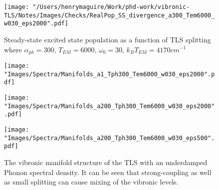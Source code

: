 \documentclass[]{article}
\begin{document}
\begin{figure}[h]
	\centering
	\texttt{[image: "/Users/henrymaguire/Work/phd-work/vibronic-TLS/Notes/Images/Checks/RealPop\_SS\_divergence\_a300\_Tem6000\_w030\_eps2000".pdf]}
	\caption{Steady-state excited state population as a function of TLS splitting where $\alpha_{ph}=300$, $T_{EM} =6000$, $\omega_0 = 30$, $k_B T_{EM}=4170cm^{-1}$}
	\label{fig:steadyStatevsSplitting}
\end{figure}

\begin{figure}[h]
	\centering
	\begin{minipage}[b]{0.325\textwidth}
		\texttt{[image: "Images/Spectra/Manifolds\_a1\_Tph300\_Tem6000\_w030\_eps2000".pdf]}
		\caption{}
		\label{fig:manifold_weakcoupling}
	\end{minipage}
	\begin{minipage}[b]{0.325\textwidth}
		\texttt{[image: "Images/Spectra/Manifolds\_a200\_Tph300\_Tem6000\_w030\_eps2000".pdf]}
		\caption{}
		\label{fig:manifold_stronglargesplitting}
	\end{minipage}
	\begin{minipage}[b]{0.325\textwidth}
		\texttt{[image: "Images/Spectra/Manifolds\_a200\_Tph300\_Tem6000\_w030\_eps500".pdf]}
		\caption{}
		\label{fig:manifold_strongsmallsplitting}
	\end{minipage}
\caption{The vibronic manifold structure of the TLS with an underdamped Phonon spectral density. It can be seen that strong-coupling as well as small splitting can cause mixing of the vibronic levels.}
\end{figure}
\end{document}
